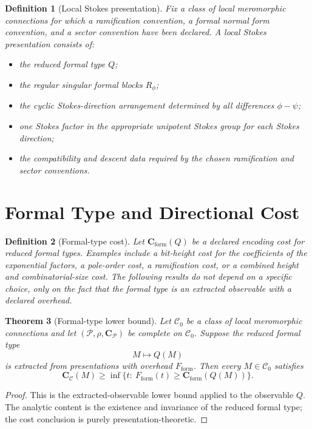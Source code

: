 \documentclass[11pt]{article}
\newtheorem{theorem}{Theorem}[section]
\newtheorem{definition}[theorem]{Definition}
\begin{document}
\begin{definition}[Local Stokes presentation]
Fix a class of local meromorphic connections for which a ramification convention, a formal normal form convention, and a sector convention have been declared.  A local Stokes presentation consists of:
\begin{itemize}[leftmargin=2em]
\item the reduced formal type \(Q\);
\item the regular singular formal blocks \(R_{\phi}\);
\item the cyclic Stokes-direction arrangement determined by all differences \(\phi-\psi\);
\item one Stokes factor in the appropriate unipotent Stokes group for each Stokes direction;
\item the compatibility and descent data required by the chosen ramification and sector conventions.
\end{itemize}
\end{definition}

\section{Formal Type and Directional Cost}

\begin{definition}[Formal-type cost]
Let \(\mathbf C_{\operatorname{form}}(Q)\) be a declared encoding cost for reduced formal types.  Examples include a bit-height cost for the coefficients of the exponential factors, a pole-order cost, a ramification cost, or a combined height and combinatorial-size cost.  The following results do not depend on a specific choice, only on the fact that the formal type is an extracted observable with a declared overhead.
\end{definition}

\begin{theorem}[Formal-type lower bound]
Let \(\mathcal C_0\) be a class of local meromorphic connections and let \((\mathcal P,\rho,\mathbf C_{\mathcal P})\) be complete on \(\mathcal C_0\).  Suppose the reduced formal type
\[
M\longmapsto Q(M)
\]
is extracted from presentations with overhead \(F_{\operatorname{form}}\).  Then every \(M\in\mathcal C_0\) satisfies
\[
\mathbf C_{\mathcal C}(M)
\ge
\inf\{t:\ F_{\operatorname{form}}(t)\ge
\mathbf C_{\operatorname{form}}(Q(M))\}.
\]
\end{theorem}

\begin{proof}
This is the extracted-observable lower bound applied to the observable \(Q\).  The analytic content is the existence and invariance of the reduced formal type; the cost conclusion is purely presentation-theoretic.
\end{proof}
\end{document}
